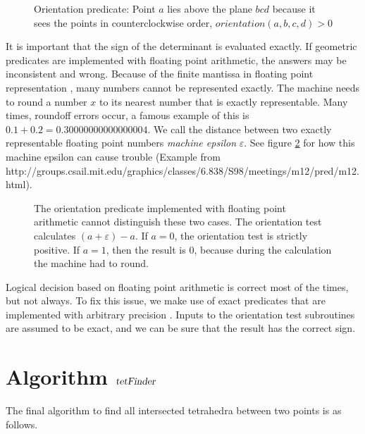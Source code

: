 \documentclass[../thesis.tex]{subfiles}
\begin{document}
\begin{figure}[htb]
  \centering
  \def\svgwidth{20em}
  
  \caption{Orientation predicate: Point $a$ lies above the plane $bcd$ because it sees the points in counterclockwise order, $orientation(a,b,c,d)>0$}
  \label{fig:orient2d}
\end{figure}
It is important that the sign of the determinant is evaluated exactly.
If geometric predicates are implemented with floating point arithmetic,
the answers may be inconsistent and wrong.
Because of the finite mantissa in floating point representation \cite{ieee754}, many numbers cannot be represented exactly.
The machine needs to round a number $x$ to its nearest number that is exactly representable.
Many times, roundoff errors occur, a famous example of this is $0.1 + 0.2 = 0.30000000000000004$.
We call the distance between two exactly representable floating point numbers \emph{machine epsilon} $\varepsilon$.
See figure \ref{fig:floatingpoint} for how this machine epsilon can cause trouble (Example from http://groups.csail.mit.edu/graphics/classes/6.838/S98/meetings/m12/pred/m12.html).
\begin{figure}[htb]
  \centering
  \def\svgwidth{20em}
  
  \caption{The orientation predicate implemented with floating point arithmetic cannot distinguish these two cases.
  The orientation test calculates $(a+\varepsilon)-a$. If $a=0$, the orientation test is strictly positive.
  If $a=1$, then the result is $0$, because during the calculation the machine had to round.
  }\label{fig:floatingpoint}
\end{figure}
Logical decision based on floating point arithmetic is correct most of the times, but not always.
To fix this issue, we make use of exact predicates that are implemented with arbitrary precision \cite{RichardShewchuk1997}.
Inputs to the orientation test subroutines are assumed to be exact, and we can be sure
that the result has the correct sign.


\section{Algorithm $\textsl{tetFinder}$}
The final algorithm to find all intersected tetrahedra between two points is as follows.
\end{document}
